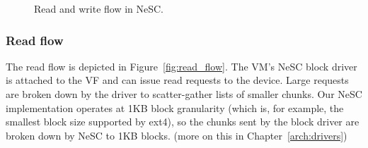 \begin{figure}[!ht]

  \vspace*{-1.5ex}
  \centering
  \caption{Read and write flow in NeSC.\label{fig:flow}}
\end{figure}

\subsubsection{Read flow}
The read flow is depicted in Figure~\ref{fig:read_flow}. The VM's NeSC block driver is attached to the VF and can issue read requests to the device. Large requests are broken down by the driver to scatter-gather lists of smaller chunks. Our NeSC implementation operates at 1KB block granularity (which is, for example, the smallest block size supported by ext4), so the chunks sent by the block driver are broken down by NeSC to 1KB blocks. (more on this in Chapter~\ref{arch:drivers}) 

